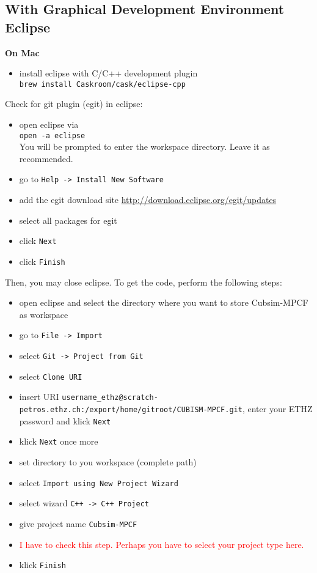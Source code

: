 \documentclass[a4paper,10pt]{article}
\begin{document}
\subsection*{With Graphical Development Environment Eclipse}

\textbf{On Mac}
\begin{itemize}
\item install eclipse with C/C++ development plugin\\
         \texttt{brew install Caskroom/cask/eclipse-cpp}
\end{itemize}
Check for git plugin (egit) in eclipse:
\begin{itemize}
\item open eclipse via\\
         \texttt{open -a eclipse}\\
         You will be prompted to enter the workspace directory. Leave it as recommended.
\item go to \texttt{Help -> Install New Software}
\item add the egit download site \url{http://download.eclipse.org/egit/updates}
\item select all packages for egit
\item click \texttt{Next}
\item click \texttt{Finish}
\end{itemize}
Then, you may close eclipse. To get the code, perform the following steps:
\begin{itemize}
\item open eclipse and select the directory where you want to store Cubsim-MPCF as workspace
\item go to \texttt{File -> Import}
\item select \texttt{Git -> Project from Git}
\item select \texttt{Clone URI}
\item insert URI \texttt{username\_ethz@scratch-petros.ethz.ch:/export/home/gitroot/CUBISM-MPCF.git}, enter your ETHZ password and klick \texttt{Next}
\item klick \texttt{Next} once more
\item set directory to you workspace (complete path)
\item select \texttt{Import using New Project Wizard}
\item select wizard \texttt{C++ -> C++ Project}
\item give project name \texttt{Cubsim-MPCF}
\item \textcolor{red} {I have to check this step. Perhaps you have to select your project type here.}
\item klick \texttt{Finish}
\end{itemize}
\end{document}

